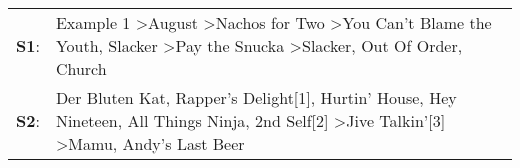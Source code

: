\begin{supertabular}{p{0.03\textwidth}p{0.92\textwidth}}
 \textbf{S1}:  &  Example 1\textsuperscript{} \textgreater \enspace August\textsuperscript{} \textgreater \enspace Nachos for Two\textsuperscript{} \textgreater \enspace You Can't Blame the Youth\textsuperscript{}, \enspace Slacker\textsuperscript{} \textgreater \enspace Pay the Snucka\textsuperscript{} \textgreater \enspace Slacker\textsuperscript{}, \enspace Out Of Order\textsuperscript{}, \enspace Church\textsuperscript{}  \enspace  \\
 \textbf{S2}:  &                  Der Bluten Kat\textsuperscript{}, \enspace Rapper's Delight[1]\textsuperscript{}, \enspace Hurtin' House\textsuperscript{}, \enspace Hey Nineteen\textsuperscript{}, \enspace All Things Ninja\textsuperscript{}, \enspace 2nd Self[2]\textsuperscript{} \textgreater \enspace Jive Talkin'[3]\textsuperscript{} \textgreater \enspace Mamu\textsuperscript{}, \enspace Andy's Last Beer\textsuperscript{}  \enspace  \\
\end{supertabular}
